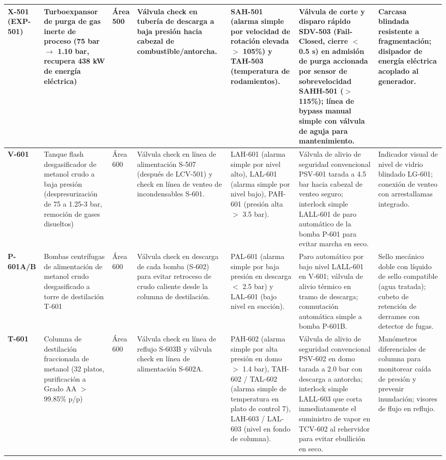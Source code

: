 \documentclass[10pt,letterpaper]{article}
\begin{document}
\begin{landscape}
\begin{xltabular}{\linewidth}{|l|p{2.8cm}|p{1.2cm}|>{\raggedright\arraybackslash}X|>{\raggedright\arraybackslash}X|>{\raggedright\arraybackslash}X|p{2.8cm}|}
\textbf{X-501 (EXP-501)} & Turboexpansor de purga de gas inerte de proceso (75 bar $\to$ 1.10 bar, recupera 438 kW de energía eléctrica) & Área 500 & Válvula check en tubería de descarga a baja presión hacia cabezal de combustible/antorcha. & SAH-501 (alarma simple por velocidad de rotación elevada $>$ 105\%) y TAH-503 (temperatura de rodamientos). & Válvula de corte y disparo rápido SDV-503 (Fail-Closed, cierre $<$ 0.5 s) en admisión de purga accionada por sensor de sobrevelocidad SAHH-501 ($>$ 115\%); línea de bypass manual simple con válvula de aguja para mantenimiento. & Carcasa blindada resistente a fragmentación; disipador de energía eléctrica acoplado al generador. \\ \hline
\textbf{V-601} & Tanque flash desgasificador de metanol crudo a baja presión (despresurización de 75 a 1.25-3 bar, remoción de gases disueltos) & Área 600 & Válvula check en línea de alimentación S-507 (después de LCV-501) y check en línea de venteo de incondensables S-601. & LAH-601 (alarma simple por nivel alto), LAL-601 (alarma simple por nivel bajo), PAH-601 (presión alta $>$ 3.5 bar). & Válvula de alivio de seguridad convencional PSV-601 tarada a 4.5 bar hacia cabezal de venteo seguro; interlock simple LALL-601 de paro automático de la bomba P-601 para evitar marcha en seco. & Indicador visual de nivel de vidrio blindado LG-601; conexión de venteo con arrestallamas integrado. \\ \hline
\textbf{P-601A/B} & Bombas centrífugas de alimentación de metanol crudo desgasificado a torre de destilación T-601 & Área 600 & Válvula check en descarga de cada bomba (S-602) para evitar retroceso de crudo caliente desde la columna de destilación. & PAL-601 (alarma simple por baja presión en descarga $<$ 2.5 bar) y LAL-601 (bajo nivel en succión). & Paro automático por bajo nivel LALL-601 en V-601; válvula de alivio térmico en tramo de descarga; conmutación automática simple a bomba P-601B. & Sello mecánico doble con líquido de sello compatible (agua tratada); cubeto de retención de derrames con detector de fugas. \\ \hline
\textbf{T-601} & Columna de destilación fraccionada de metanol (32 platos, purificación a Grado AA $>$ 99.85\% p/p) & Área 600 & Válvula check en línea de reflujo S-603B y válvula check en línea de alimentación S-602A. & PAH-602 (alarma simple por alta presión en domo $>$ 1.4 bar), TAH-602 / TAL-602 (alarma simple de temperatura en plato de control 7), LAH-603 / LAL-603 (nivel en fondo de columna). & Válvula de alivio de seguridad convencional PSV-602 en domo tarada a 2.0 bar con descarga a antorcha; interlock simple LALL-603 que corta inmediatamente el suministro de vapor en TCV-602 al rehervidor para evitar ebullición en seco. & Manómetros diferenciales de columna para monitorear caída de presión y prevenir inundación; visores de flujo en reflujo. \\ \hline

\end{xltabular}
\end{landscape}
\end{document}
